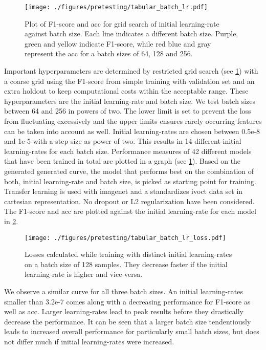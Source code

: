 \begin{figure}[H]
    \centering
    \texttt{[image: ./figures/pretesting/tabular\_batch\_lr.pdf]}
    \caption[Grid search initial \gls{learning-rate} with batch size]{Plot of F1-score and \acrshort{acc} for grid search of initial \gls{learning-rate} against batch size. Each line indicates a different batch size. Purple, green and yellow indicate F1-score, while red blue and gray represent the \acrshort{acc} for a batch sizes of 64, 128 and 256.}
    \label{fig:gridsearch_lr}
\end{figure}
Important hyperparameters are determined by restricted grid search (see \cref{fig:gridsearch_lr}) with a coarse grid using the F1-score from simple training with validation set and an extra holdout to keep computational costs within the acceptable range. These hyperparameters are the initial \gls{learning-rate} and batch size. We test batch sizes between 64 and 256 in powers of two. The lower limit is set to prevent the loss from fluctuating excessively and the upper limits ensures rarely occurring features can be taken into account as well. Initial \glspl{learning-rate} are chosen between 0.5e-8 and 1e-5 with a step size as power of two. This results in 14 different initial \glspl{learning-rate} for each batch size. Performance measures of 42 different models that have been trained in total are plotted in a graph (see \cref{fig:gridsearch_lr}). Based on the generated generated curve, the model that performs best on the combination of both, initial \gls{learning-rate} and batch size, is picked as starting point for training. Transfer learning is used with \gls{imagenet} and a standardizes \acrshort{ivoct} data set in cartesian representation. No dropout or L2 regularization have been considered. The F1-score and \acrshort{acc} are plotted against the initial \gls{learning-rate} for each model in \cref{fig:lr_bs}.
\begin{figure}[H]
    \centering
    \texttt{[image: ./figures/pretesting/tabular\_batch\_lr\_loss.pdf]}
    \caption[Training loss of grid search]{Losses calculated while training with distinct initial \glspl{learning-rate} on a batch size of 128 samples. They decrease faster if the initial \gls{learning-rate} is higher and vice versa.}
    \label{fig:lr_bs}
\end{figure}
We observe a similar curve for all three batch sizes. An initial \glspl{learning-rate} smaller than 3.2e-7 comes along with a decreasing performance for F1-score as well as \acrshort{acc}. Larger \glspl{learning-rate} lead to peak results before they drastically decrease the performance. It can be seen that a larger batch size tendentiously leads to increased overall performance for particularly small batch sizes, but does not differ much if initial \glspl{learning-rate} were increased.


